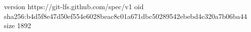 version https://git-lfs.github.com/spec/v1
oid sha256:b4d5f8e47d50ef554e6028beac8c01a671dbc50289542ebebd4c320a7b06ba44
size 1892
